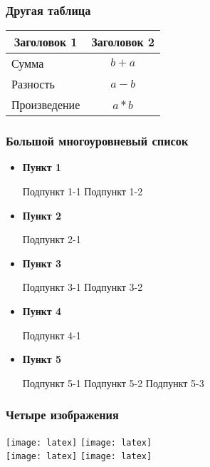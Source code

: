 \begin{frame}
    \frametitle{Другая таблица}
    \centering
    \begin{tabular}{lc}
        \toprule
        \multicolumn{1}{c}{\textbf{Заголовок 1}} & \textbf{Заголовок 2} \\ \midrule
        Сумма                                    & \(b+a\)                \\
        Разность                                 & \(a-b\)                \\
        Произведение                             & \(a*b\)                \\
        \bottomrule
    \end{tabular}
\end{frame}


\begin{frame}
    \frametitle{Большой многоуровневый список}
    \begin{itemize}
        \item \textbf{Пункт 1}
              \begin{itemize}
                  \itemi Подпункт 1-1
                  \itemi Подпункт 1-2
              \end{itemize}
        \item \textbf{Пункт 2}
              \begin{itemize}
                  \itemi Подпункт 2-1
              \end{itemize}
        \item \textbf{Пункт 3}
              \begin{itemize}
                  \itemi Подпункт 3-1
                  \itemi Подпункт 3-2
              \end{itemize}
        \item \textbf{Пункт 4}
              \begin{itemize}
                  \itemi Подпункт 4-1
              \end{itemize}
        \item \textbf{Пункт 5}
              \begin{itemize}
                  \itemi Подпункт 5-1
                  \itemi Подпункт 5-2
                  \itemi Подпункт 5-3
              \end{itemize}
    \end{itemize}
\end{frame}

\begin{frame}
    \frametitle{Четыре изображения}
    \centering
    \texttt{[image: latex]}
    \texttt{[image: latex]}\\
    \texttt{[image: latex]}
    \texttt{[image: latex]}
\end{frame}

